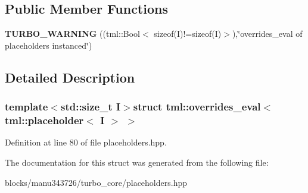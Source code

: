 \subsection*{Public Member Functions}
\begin{DoxyCompactItemize}
\item 
\hypertarget{structtml_1_1overrides__eval_3_01tml_1_1placeholder_3_01_i_01_4_01_4_a7631e211b31e6defc645bbe872878812}{{\bfseries T\+U\+R\+B\+O\+\_\+\+W\+A\+R\+N\+I\+N\+G} ((tml\+::\+Bool$<$ sizeof(I)!=sizeof(I)$>$),\char`\"{}overrides\+\_\+eval of placeholders instanced\char`\"{})}\label{structtml_1_1overrides__eval_3_01tml_1_1placeholder_3_01_i_01_4_01_4_a7631e211b31e6defc645bbe872878812}

\end{DoxyCompactItemize}


\subsection{Detailed Description}
\subsubsection*{template$<$std\+::size\+\_\+t I$>$struct tml\+::overrides\+\_\+eval$<$ tml\+::placeholder$<$ I $>$ $>$}



Definition at line 80 of file placeholders.\+hpp.



The documentation for this struct was generated from the following file\+:\begin{DoxyCompactItemize}
\item 
blocks/manu343726/turbo\+\_\+core/placeholders.\+hpp\end{DoxyCompactItemize}
